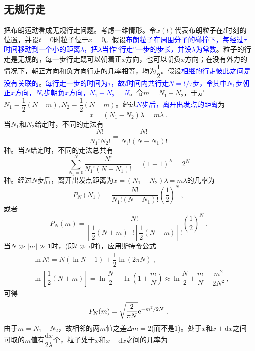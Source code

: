 \documentclass[11pt,a4paper]{article}
\newcommand{\dif}{\mathrm{d}}
\begin{document}
\subsection{无规行走}
\cite{2007热力学与统计物理学} 把布朗运动看成无规行走问题。考虑一维情形。令$x(t)$代表布朗粒子在$t$时刻的位置，并设$t=0$时粒子位于$x=0$。假设\textcolor{blue}{布朗粒子在周围分子的碰撞下，每经过$\tau$时间移动到一个小的距离$\lambda$，把$\lambda$当作``行走”一步的步长，并设$\lambda$为常数}。粒子的行走是无规的，每一步行走既可以朝着正$x$方向，也可以朝负$x$方向；在没有外力的情况下，朝正方向和负方向行走的几率相等，均为$\dfrac{1}{2}$。假设\textcolor{blue}{相继的行走彼此之间是没有关联的}。\textcolor{blue}{每行走一步的时间为$\tau$，故$t$时间内共行走$N=t/\tau$步，令其中$N_1$步朝正$x$方向，$N_2$步朝负$x$方向，$N_1+N_2=N$}。令$m=N_1-N_2$，于是$N_1 = \dfrac{1}{2}(N+m), N_2 = \dfrac{1}{2}(N-m)$。经过\textcolor{blue}{$N$步后，离开出发点的距离}为
\begin{equation}
x = (N_1 -N_2) \lambda = m \lambda ~.
\end{equation}
当$N_1$和$N_2$给定时，不同的走法有
\begin{equation}
\dfrac{N!}{N_1!N_2!} = \dfrac{N!}{N_1!(N-N_1)!} 
\end{equation}
种。当$N$给定时，不同的走法总共有
\begin{equation}
\sum_{N_1=0}^N \dfrac{N!}{N_1!(N-N_1)!} = (1+1)^N = 2^N 
\end{equation}
种。经过$N$步后，离开出发点距离为$x=(N_1-N_2) \lambda = m \lambda$的几率为
\begin{equation}
P_N(N_1) = \dfrac{N!}{N_1!(N-N_1)!} \left(\dfrac{1}{2} \right)^N ~,
\end{equation}
或者
\begin{equation}
P_N(m) = \dfrac{N!}{\left[\dfrac{1}{2}(N+m) \right]!\left[\dfrac{1}{2}(N-m) \right]!} \left(\dfrac{1}{2} \right)^N ~.
\end{equation}
当$N \gg |m| \gg 1$时，(即$t \gg \tau$时)，应用斯特令公式
\begin{align}
\nonumber & \ln N! = N(\ln N -1) +\dfrac{1}{2} \ln (2\pi N) ~, \\
\nonumber & \ln \left[ \dfrac{1}{2} (N\pm m) \right] = \ln \dfrac{N}{2} +\ln \left(1 \pm \dfrac{m}{N} \right)  \approx \ln \dfrac{N}{2}  \pm \dfrac{m}{N} - \dfrac{m^2}{2N^2} ~,
\end{align}
可得
\begin{equation}
P_N(m) = \sqrt{\dfrac{2}{\pi N}} {\rm e}^{-m^2/2N} ~.
\end{equation}
由于$m=N_1-N_2$，故相邻的两$m$值之差$\Delta m = 2$(而不是$1$)。处于$x$和$x+\dif x$之间可取的$m$值有$\dfrac{\dif x}{2\lambda}$个，粒子处于$x$和$x+\dif x$之间的几率为
\end{document}
